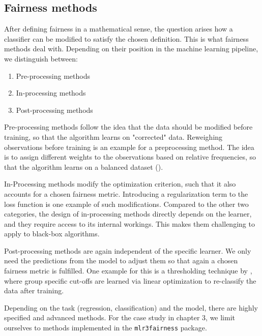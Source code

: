 \subsection{Fairness methods}
After defining fairness in a mathematical sense, the question arises how a classifier can be modified to satisfy the chosen definition. This is what fairness methods deal with.
Depending on their position in the machine learning pipeline, we distinguish between:
\begin{enumerate}
    \item Pre-processing methods
    \item In-processing methods
    \item Post-processing methods
\end{enumerate}
Pre-processing methods follow the idea that the data should be modified before training, so that the algorithm learns on "corrected" data. Reweighing observations before training is an example for a preprocessing method. The idea is to assign different weights to the observations based on relative frequencies, so that the algorithm learns on a balanced dataset (\cite{caton2024}).\par
In-Processing methods modify the optimization criterion, such that it also accounts for a chosen fairness metric. Introducing a regularization term to the loss function is one example of such modifications. Compared to the other two categories, the design of in-processing methods directly depends on the learner, and they require access to its internal workings. This makes them challenging to apply to black-box algorithms.\par
Post-processing methods are again independent of the specific learner. We only need the predictions from the model to adjust them so that again a chosen fairness metric is fulfilled. One example for this is a thresholding technique by \cite{hardt2016}, where group specific cut-offs are learned via linear optimization to re-classify the data after training.\par
Depending on the task (regression, classification) and the model, there are highly specified and advanced methods. For the case study in chapter 3, we limit ourselves to methods implemented in the \texttt{mlr3fairness} package.

